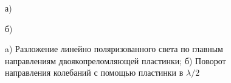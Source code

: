 \documentclass[12pt,a4paper]{article}
\begin{document}
	
	\begin{figure}[h!]
		\begin{minipage}[h!]{0.49\linewidth}
			 {а)}
		\end{minipage}
		\hfill
		\begin{minipage}[h!]{0.49\linewidth}
			 {б)}
		\end{minipage}
		\caption{a) Разложение линейно поляризованного света по главным направлениям двоякопреломляющей пластинки; б) Поворот направления колебаний с помощью пластинки в $\lambda/2$}
	\end{figure}	
		
\end{document}
